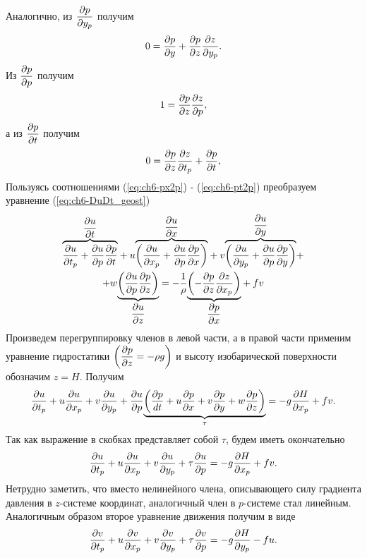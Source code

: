     Аналогично, из $\pd{p}{y_p}$ получим
    \begin{equation}
        \label{eq:ch6-py2p}
        0=\pd{p}{y}+\pd{p}{z}\pd{z}{y_p}.
    \end{equation}
    Из $\pd{p}{p}$ получим
    \begin{equation}
        \label{eq:ch6-pz2p}
        1=\pd{p}{z}\pd{z}{p},
    \end{equation}
    а из $\pd{p}{t}$ получим
    \begin{equation}
        \label{eq:ch6-pt2p}
        0=\pd{p}{z}\pd{z}{t_p}+\pd{p}{t},
    \end{equation}
    Пользуясь соотношениями (\ref{eq:ch6-px2p}) - (\ref{eq:ch6-pt2p}) преобразуем уравнение (\ref{eq:ch6-DuDt_geost})
    \begin{multline*} 
        {\overbrace{\pd{u}{t_p}+\pd{u}{p}\pd{p}{t}}^{\pd{u}{t}}}+
        u{\overbrace{\left( \pd{u}{x_p} + \pd{u}{p}\pd{p}{x} \right)}^{\pd{u}{x}}} +
        v{\overbrace{\left( \pd{u}{y_p} + \pd{u}{p}\pd{p}{y} \right)}^{\pd{u}{y}}} + \\
        + w{\underbrace{\left( \pd{u}{p}\pd{p}{z} \right)}_{\pd{u}{z}}} = 
         -\frac{1}{\rho} {\underbrace{\left( -\pd{p}{z}\pd{z}{x_p} \right)}_{\pd{p}{x}}} + fv
    \end{multline*}
    Произведем перегруппировку членов в левой части, а в правой части применим уравнение гидростатики $\left( \pd{p}{z}=-\rho g \right)$ и высоту изобарической поверхности обозначим $z=H$. Получим
    \begin{equation*}
        \pd{u}{t_p}+u\pd{u}{x_p}+v\pd{u}{y_p}+
        \pd{u}{p} {\underbrace{ \left( \fd{p} \right) }_{\tau}} = - g \pd{H}{x_p}+fv.
    \end{equation*}
    Так как выражение в скобках представляет собой $\tau$, будем иметь окончательно
    \begin{equation}
        \label{eq:ch6-DuDt2p}
        \pd{u}{t_p}+u\pd{u}{x_p}+v\pd{u}{y_p}+
        \tau\pd{u}{p} = -g \pd{H}{x_p}+fv.
    \end{equation}
    Нетрудно заметить, что вместо нелинейного члена, описывающего силу градиента давления в $z$-системе координат, аналогичный член в $p$-системе стал линейным.
    Аналогичным образом второе уравнение движения получим в виде 
    \begin{equation}
        \label{eq:ch6-DvDt2p}
        \pd{v}{t_p}+u\pd{v}{x_p}+v\pd{v}{y_p}+
        \tau\pd{v}{p} = - g \pd{H}{y_p}-fu.
    \end{equation}
